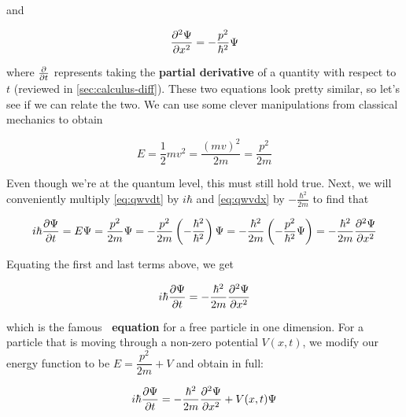 \noindent and

\begin{equation}
	\pdv[2]{\Psi}{x} = -\frac{p^2}{\hbar^2}\Psi \label{eq:qwvdx}
\end{equation}

\noindent where $\pdv{t}$ represents taking the \textbf{partial derivative} of a quantity with respect to $t$ (reviewed in \autoref{sec:calculus-diff}). 
These two equations look pretty similar, so let's see if we can relate the two. 
We can use some clever manipulations from classical mechanics to obtain 

\begin{equation} 
	E = \frac{1}{2}mv^2 = \frac{(mv)^2}{2m} = \frac{p^2}{2m}
\end{equation}

Even though we're at the quantum level, this must still hold true. 
Next, we will conveniently multiply \autoref{eq:qwvdt} by $i\hbar$ and \autoref{eq:qwvdx} by $-\frac{\hbar^2}{2m}$ to find that

\begin{equation*}
	i\hbar \pdv{\Psi}{t} = E\Psi = \frac{p^2}{2m} \Psi 
	= -\frac{p^2}{2m} \left( -\frac{\hbar^2}{\hbar^2} \right) \Psi = -\frac{\hbar^2}{2m} \left( -\frac{p^2}{\hbar^2}\Psi \right) 
	= -\frac{\hbar^2}{2m} \pdv[2]{\Psi}{x}
\end{equation*}

Equating the first and last terms above, we get 

\begin{equation}
	i\hbar \pdv{\Psi}{t} = -\frac{\hbar^2}{2m} \pdv[2]{\Psi}{x}
\end{equation}

\noindent which is the famous \textbf{\Sch\ equation} for a free particle in one dimension. 
For a particle that is moving through a non-zero potential $V(x,t)$, we modify our energy function to be $E = \dfrac{p^2}{2m} + V$ and obtain in full: 

\begin{tcolorbox}[title=Time-dependent \Sch\ equation] \vspace{-2ex}
	\begin{equation}
		i\hbar \pdv{\Psi}{t} = -\frac{\hbar^2}{2m} \pdv[2]{\Psi}{x} + V(x,t)\Psi \label{eq:tdse}
	\end{equation}
\end{tcolorbox}


